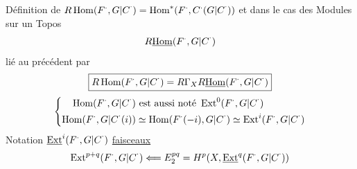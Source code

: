 Définition de $R\operatorname{Hom}(F^\cdot,\relax{G|C}^\cdot)=\operatorname{Hom}^*(F^\cdot,C^\cdot(\relax{G|C}^\cdot))$
et dans le cas des Modules sur un Topos
\[
R\underline{\operatorname{Hom}}(F^\cdot,\relax{G|C}^\cdot)
\]
lié au précédent par
\[
\boxed{R\operatorname{Hom}(F^\cdot,\relax{G|C}^\cdot)=R\Gamma_X R\underline{\operatorname{Hom}}(F^\cdot,\relax{G|C}^\cdot)}
\]
\[
\left\{\begin{aligned}
\operatorname{Hom}(F^\cdot,\relax{G|C}^\cdot)&\text{ est aussi noté }\operatorname{Ext}^0(F^\cdot,\relax{G|C}^\cdot)\\
\operatorname{Hom}(F^\cdot,\relax{G|C}^\cdot(i))&\simeq\operatorname{Hom}(F^\cdot(-i),\relax{G|C}^\cdot)\simeq\operatorname{Ext}^i(F^\cdot,\relax{G|C}^\cdot)
\end{aligned}\right.
\]
Notation $\underline{\operatorname{Ext}}^i(F^\cdot,\relax{G|C}^\cdot)$ \uline{faisceaux}
\[
\operatorname{Ext}^{p+q}(F^\cdot,\relax{G|C}^\cdot)\Longleftarrow E_2^{pq}=H^p(X,\underline{\operatorname{Ext}}^q(F^\cdot,\relax{G|C}^\cdot))
\]
